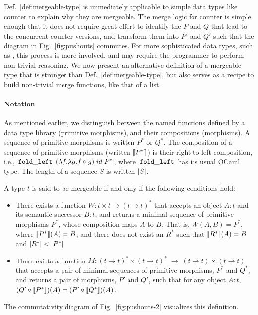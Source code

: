 Def.~\ref{def:mergeable-type} is immediately applicable to simple data
types like counter to explain why they are mergeable. The merge logic
for counter is simple enough that it does not require great effort to
identify the $P$ and $Q$ that lead to the concurrent counter versions,
and transform them into $P'$ and $Q'$ such that the diagram in
Fig.~\ref{fig:pushouts} commutes. For more
sophisticated data types, such as , this process is more involved,
and may require the programmer to perform non-trivial reasoning. We
now present an alternative definition of a mergeable type that is
stronger than Def.~\ref{def:mergeable-type}, but also serves as a
recipe to build non-trivial merge functions, like that of a list.

\paragraph{Notation} As mentioned earlier, we distinguish between the
named functions defined by a data type library (primitive morphisms),
and their compositions (morphisms). A sequence of primitive morphisms
is written $P^*$ or $Q^*$. The composition of a sequence of primitive
morphisms (written $\llbracket P^* \rrbracket$) is their right-to-left composition,
i.e., $\,{\tt fold\_left}\,\;(\lambda f.\lambda g. f \circ g)\; id\; P^*$,
where $\,{\tt fold\_left}\,$ has its usual OCaml type. The length of a
sequence $S$ is written $\left|S\right|$.

\begin{definition} 
\label{def:mergeable-type-2}
A type $t$ is said to be mergeable if and only if the following
conditions hold:
\begin{itemize}
  \item There exists a function $W: t \times t \rightarrow (t
  \rightarrow t)^*$ that accepts an object $A:t$ and its
  semantic successor $B:t$, and returns a minimal sequence of
  primitive morphisms $P^*$, whose composition maps $A$ to $B$. That
  is, $W(A,B) = P^*$, where $\llbracket P^* \rrbracket(A) = B$, and there does not
  exist an $R^*$ such that $\llbracket R^* \rrbracket(A) = B$ and $\left|R^*\right| <
  \left|P^*\right|$

  \item There exists a function $M: (t \rightarrow t)^*\!\times\!(t
  \rightarrow t)^* \;\rightarrow\; (t \rightarrow t)\!\times\!(t
  \rightarrow t)$ that accepts a pair of minimal sequences of
  primitive morphisms, $P^*$ and $Q^*$, and returns a pair of morphisms,
  $P'$ and $Q'$, such that for any object $A:t$, $(Q' \circ
  \llbracket P^* \rrbracket)(A) = (P' \circ \llbracket Q^* \rrbracket)(A)$.
\end{itemize}
The commutativity diagram of Fig.~\ref{fig:pushouts-2} visualizes this
definition.
\end{definition}

